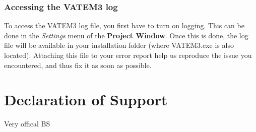 \documentclass[10pt,a4paper,oneside]{report}             %
\begin{document}
\subsection{Accessing the VATEM3 log}

To access the VATEM3 log file, you first have to turn on logging. This can be done in the \textit{Settings} menu of the \textbf{Project Window}. Once this is done, the log file will be available in your installation folder (where VATEM3.exe is also located). Attaching this file to your error report help us reproduce the issue you encountered, and thus fix it as soon as possible.

\chapter*{Declaration of Support}

Very offical BS

\nocite{*}
\printbibliography[title=Acknowledgements,heading=bibliography,keyword=0]


\label{page:last}
\end{document}
